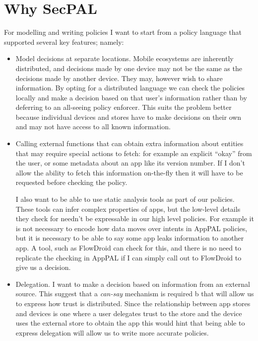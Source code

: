 \documentclass[thesis.tex]{subfiles}
\begin{document}
\section{Why SecPAL}
\label{sec:why-apppal}

For modelling and writing policies I want to start from a policy
language that supported several key features; namely:

\begin{itemize}
  \item Model decisions at separate locations.  Mobile ecosystems are
    inherently distributed, and decisions made by one device may not be
    the same as the decisions made by another device.  They may, however
    wish to share information.  By opting for a distributed language we
    can check the policies locally and make a decision based on that
    user's information rather than by deferring to an all-seeing policy
    enforcer.  This suits the problem better because individual devices
    and stores have to make decisions on their own and may not have access
    to all known information.

  \item Calling external functions that can obtain extra information
    about entities that may require special actions to fetch: for example
    an explicit ``okay'' from the user, or some metadata about an app like
    its version number.  If I don't allow the ability to fetch this
    information on-the-fly then it will have to be requested before
    checking the policy.

    I also want to be able to use static analysis tools as part of
    our policies.  These tools can infer complex properties of apps, but
    the low-level details they check for needn't be expressable in our
    high level policies.  For example it is not necessary to encode how
    data moves over intents in AppPAL policies, but it is necessary to be
    able to say some app leaks information to another app.  A tool, such
    as FlowDroid can check for this, and there is no need to replicate the
    checking in AppPAL if I can simply call out to FlowDroid to give us a
    decision.

  \item Delegation.  I want to make a decision based on information from an
    external source.  This suggest that a \emph{can-say} mechanism is required
    b
    that will allow us to express how trust is distributed.   Since the
    relationship between app stores and devices is one where a user delegates
    trust to the store and the device uses the external store to obtain the app
    this would hint that being able to express delegation will allow us to write
    more accurate policies.
\end{itemize}
\end{document}
